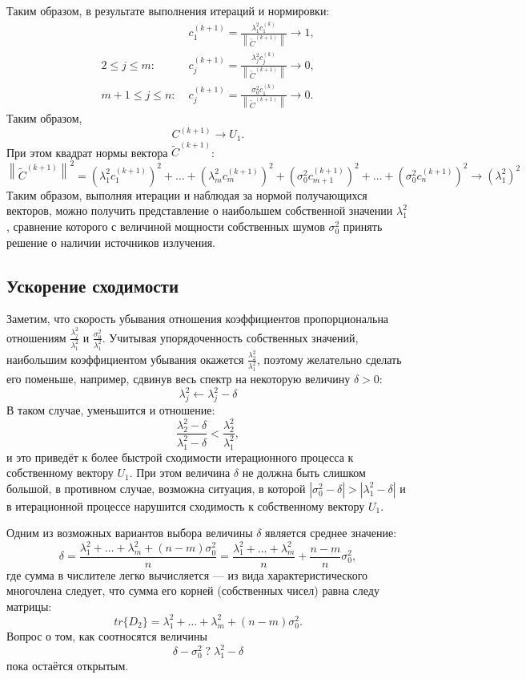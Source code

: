 \documentclass[a4paper,12pt]{article}
\newcommand{\modulus}[1]{\left | #1 \right |}
\newcommand{\norm}[1]{\left \| #1 \right \|}
\newcommand{\trace}[1]{tr \{ #1 \}}
\begin{document}
    Таким образом, в результате выполнения итераций и нормировки:
    \begin{align*}
        & c_1^{(k+1)} = \frac{\lambda_1^2 c_1^{(k)}}{\norm{\widetilde{C}^{(k+1)}}} \rightarrow 1, \\
        2 \le j \le m : \; & c_j^{(k+1)} = \frac{\lambda_j^2 c_j^{(k)}}{\norm{\widetilde{C}^{(k+1)}}} \rightarrow 0, \\
        m+1 \le j \le n : \; & c_j^{(k+1)} = \frac{\sigma_0^2 c_1^{(k)}}{\norm{\widetilde{C}^{(k+1)}}} \rightarrow 0 .
    \end{align*}
    Таким образом,
    \[
        C^{(k+1)} \rightarrow U_1 .
    \]
    При этом квадрат нормы вектора $\widetilde{C}^{(k+1)}$:
    \[
        \norm{\widetilde{C}^{(k+1)}}^2
        = (\lambda_1^2 c_1^{(k+1)})^2 + \dots + (\lambda_m^2 c_m^{(k+1)})^2 + (\sigma_0^2 c_{m+1}^{(k+1)})^2 + \dots + (\sigma_0^2 c_n^{(k+1)})^2
        \rightarrow (\lambda_1^2)^2
    \]
    Таким образом, выполняя итерации и наблюдая за нормой получающихся векторов, можно получить представление о наибольшем собственной значении $\lambda_1^2$, сравнение которого с
    величиной мощности собственных шумов $\sigma_0^2$ принять решение о наличии источников излучения.

    \subsection{Ускорение сходимости}
    Заметим, что скорость убывания отношения коэффициентов пропорциональна отношениям $\frac{\lambda_j^2}{\lambda_1^2}$ и $\frac{\sigma_0^2}{\lambda_1^2}$. Учитывая упорядоченность
    собственных значений, наибольшим коэффициентом убывания окажется $\frac{\lambda_2^2}{\lambda_1^2}$, поэтому желательно сделать его поменьше, например, сдвинув весь спектр на
    некоторую величину $\delta>0$:
    \[
        \lambda_j^2 \leftarrow \lambda_j^2 - \delta
    \]
    В таком случае, уменьшится и отношение:
    \[
        \frac{\lambda_2^2 - \delta}{\lambda_1^2 - \delta} < \frac{\lambda_2^2}{\lambda_1^2} ,
    \]
    и это приведёт к более быстрой сходимости итерационного процесса к собственному вектору $U_1$.
    При этом величина $\delta$ не должна быть слишком большой, в противном случае, возможна ситуация, в которой $\modulus{\sigma_0^2 - \delta} > \modulus{\lambda_1^2 - \delta}$ и
    в итерационной процессе нарушится сходимость к собственному вектору $U_1$.

    Одним из возможных вариантов выбора величины $\delta$ является среднее значение:
    \[
        \delta
        = \frac{\lambda_1^2 + \dots + \lambda_m^2 + (n-m) \sigma_0^2}{n}
        = \frac{\lambda_1^2 + \dots + \lambda_m^2}{n} + \frac{n-m}{n} \sigma_0^2,
    \]
    где сумма в числителе легко вычисляется --- из вида характеристического многочлена следует, что сумма его корней (собственных чисел) равна следу матрицы:
    \[
        \trace{D_2} = \lambda_1^2 + \dots + \lambda_m^2 + (n-m) \sigma_0^2 .
    \]
    Вопрос о том, как соотносятся величины
    \[
        \delta - \sigma_0^2 \; ? \; \lambda_1^2 - \delta
    \]
    пока остаётся открытым.
\end{document}
